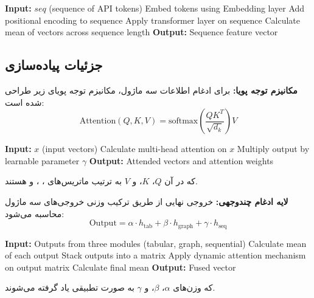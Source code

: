 \documentclass[a4paper,oneside,12pt]{report}
\theoremstyle{definition}
\begin{document}
\begin{algorithm}[!htbp]
\caption{SequenceTransformer Module Structure}
\label{alg:sequence_transformer}
\begin{algorithmic}[1]
\STATE \textbf{Input:} $seq$ (sequence of API tokens)
\STATE Embed tokens using Embedding layer
\STATE Add positional encoding to sequence
    \STATE Apply transformer layer on sequence
\ENDFOR
\STATE Calculate mean of vectors across sequence length
\STATE \textbf{Output:} Sequence feature vector
\end{algorithmic}
\end{algorithm}

\subsection{جزئیات پیاده‌سازی}
\textbf{مکانیزم توجه پویا:}
برای ادغام اطلاعات سه ماژول، مکانیزم توجه پویای زیر طراحی شده است:
\begin{equation}
\text{Attention}(Q, K, V) = \text{softmax}\left(\frac{QK^T}{\sqrt{d_k}}\right)V
\end{equation}

\begin{algorithm}[!htbp]
\caption{Dynamic Attention Mechanism}
\label{alg:dynamic_attention}
\begin{algorithmic}[1]
\STATE \textbf{Input:} $x$ (input vectors)
\STATE Calculate multi-head attention on $x$
\STATE Multiply output by learnable parameter $\gamma$
\STATE \textbf{Output:} Attended vectors and attention weights
\end{algorithmic}
\end{algorithm}
که در آن $Q$، $K$، و $V$ به ترتیب ماتریس‌های ، ، و  هستند.

\textbf{لایه ادغام چندوجهی:}
خروجی نهایی از طریق ترکیب وزنی خروجی‌های سه ماژول محاسبه می‌شود:
\begin{equation}
\text{Output} = \alpha \cdot h_{\text{tab}} + \beta \cdot h_{\text{graph}} + \gamma \cdot h_{\text{seq}}
\end{equation}

\begin{algorithm}[!htbp]
\caption{Modality Fusion}
\label{alg:modality_fusion}
\begin{algorithmic}[1]
\STATE \textbf{Input:} Outputs from three modules (tabular, graph, sequential)
\STATE Calculate mean of each output
\STATE Stack outputs into a matrix
\STATE Apply dynamic attention mechanism on output matrix
\STATE Calculate final mean
\STATE \textbf{Output:} Fused vector
\end{algorithmic}
\end{algorithm}
که وزن‌های $\alpha$، $\beta$، و $\gamma$ به صورت تطبیقی یاد گرفته می‌شوند.
\end{document}

